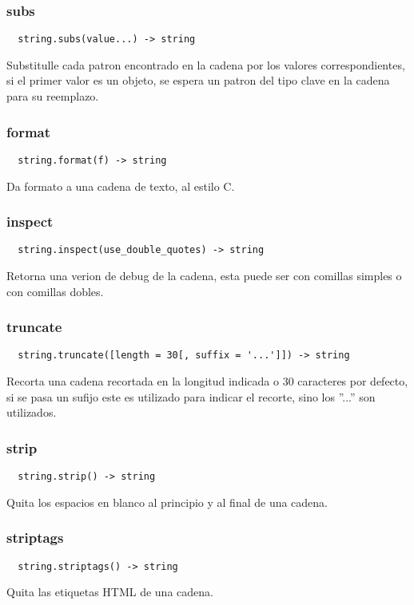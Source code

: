 \subsubsection*{subs}
\begin{verbatim}
  string.subs(value...) -> string
\end{verbatim}
Substitulle cada patron encontrado en la cadena por los valores correspondientes, si el primer valor es un objeto, se espera un patron del tipo clave en la cadena para su reemplazo.

\subsubsection*{format}
\begin{verbatim}
  string.format(f) -> string
\end{verbatim}
Da formato a una cadena de texto, al estilo C.

\subsubsection*{inspect} 
\begin{verbatim}
  string.inspect(use_double_quotes) -> string
\end{verbatim}
Retorna una verion de debug de la cadena, esta puede ser con comillas simples o con comillas dobles.

\subsubsection*{truncate}
\begin{verbatim}
  string.truncate([length = 30[, suffix = '...']]) -> string
\end{verbatim}
Recorta una cadena recortada en la longitud indicada o 30 caracteres por defecto, si se pasa un sufijo este es utilizado para indicar el recorte, sino los ''...'' son utilizados.

\subsubsection*{strip}
\begin{verbatim}
  string.strip() -> string
\end{verbatim}
Quita los espacios en blanco al principio y al final de una cadena.

\subsubsection*{striptags}
\begin{verbatim}
  string.striptags() -> string
\end{verbatim}
Quita las etiquetas HTML de una cadena.

